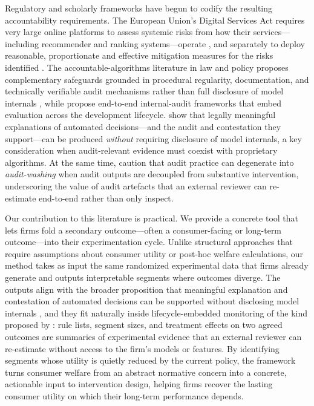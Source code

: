 \documentclass[11pt,letterpaper,english]{article}
\theoremstyle{definition}
\theoremstyle{definition}
\begin{document}
\begin{bibunit}
Regulatory and scholarly frameworks have begun to codify the resulting accountability requirements. The European Union's Digital Services Act requires very large online platforms to assess systemic risks from how their services---including recommender and ranking systems---operate \citep{dsa2022article34}, and separately to deploy reasonable, proportionate and effective mitigation measures for the risks identified \citep{dsa2022article35}. The accountable-algorithms literature in law and policy proposes complementary safeguards grounded in procedural regularity, documentation, and technically verifiable audit mechanisms rather than full disclosure of model internals \citep{kroll2017_accountable_algorithms}, while \citet{raji2020_internal_audit} propose end-to-end internal-audit frameworks that embed evaluation across the development lifecycle. \citet{wachter2017counterfactual} show that legally meaningful explanations of automated decisions---and the audit and contestation they support---can be produced \emph{without} requiring disclosure of model internals, a key consideration when audit-relevant evidence must coexist with proprietary algorithms. At the same time, \citet{goodman2022_auditwashing} caution that audit practice can degenerate into \emph{audit-washing} when audit outputs are decoupled from substantive intervention, underscoring the value of audit artefacts that an external reviewer can re-estimate end-to-end rather than only inspect.

Our contribution to this literature is practical. We provide a concrete tool that lets firms fold a secondary outcome---often a consumer-facing or long-term outcome---into their experimentation cycle. Unlike structural approaches that require assumptions about consumer utility or post-hoc welfare calculations, our method takes as input the same randomized experimental data that firms already generate and outputs interpretable segments where outcomes diverge. The outputs align with the broader proposition that meaningful explanation and contestation of automated decisions can be supported without disclosing model internals \citep{wachter2017counterfactual}, and they fit naturally inside lifecycle-embedded monitoring of the kind proposed by \citet{raji2020_internal_audit}: rule lists, segment sizes, and treatment effects on two agreed outcomes are summaries of experimental evidence that an external reviewer can re-estimate without access to the firm's models or features. By identifying segments whose utility is quietly reduced by the current policy, the framework turns consumer welfare from an abstract normative concern into a concrete, actionable input to intervention design, helping firms recover the lasting consumer utility on which their long-term performance depends.


\end{bibunit}
\end{document}

